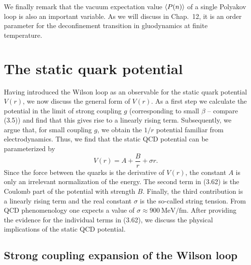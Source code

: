 We finally remark that the vacuum expectation value $\left\langle P(n) \right\rangle$ of a single
Polyakov loop is also an important variable. As we will discuss in Chap.~12, it
is an order parameter for the deconfinement transition in gluodynamics at
finite temperature.

\section{The static quark potential}

Having introduced the Wilson loop as an observable for the static quark
potential $V(r)$, we now discuss the general form of $V(r)$. As a first step we
calculate the potential in the limit of strong coupling $g$ (corresponding to
small $\beta$ -- compare (3.5)) and find that this gives rise to a linearly
rising term. Subsequently, we argue that, for small coupling $g$, we obtain the
$1/r$ potential familiar from electrodynamics. Thus, we find that the static
QCD potential can be parameterized by
\begin{equation}
  V(r) = A + \frac{B}{r} + \sigma r .
\end{equation}
Since the force between the quarks is the derivative of $V(r)$, the constant
$A$ is only an irrelevant normalization of the energy. The second term in
(3.62) is the Coulomb part of the potential with strength $B$. Finally, the
third contribution is a linearly rising term and the real constant $\sigma$ is
the so-called string tension. From QCD phenomenology one expects a value of
$\sigma \approx 900\ \mathrm{MeV}/\mathrm{fm}$. After providing the evidence
for the individual terms in (3.62), we discuss the physical implications of the
static QCD potential.

\subsection{Strong coupling expansion of the Wilson loop}

